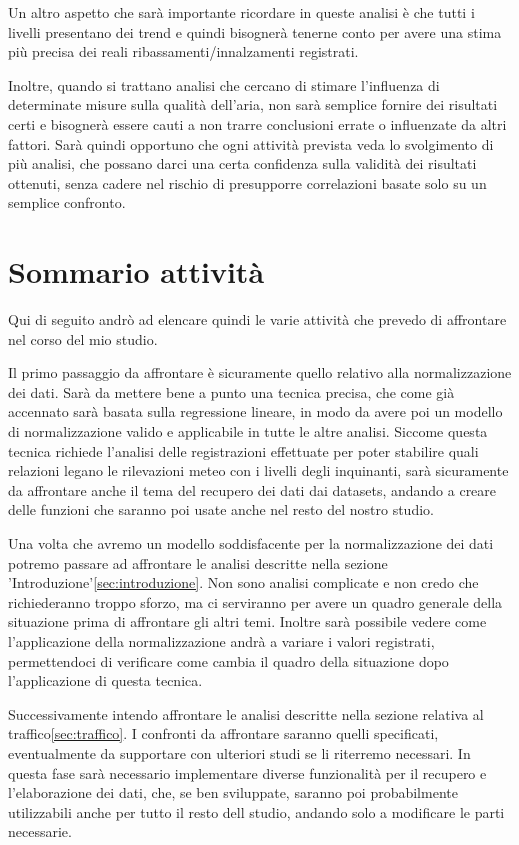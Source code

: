 \documentclass{article}
\begin{document}
Un altro aspetto che sarà importante ricordare in queste analisi è che tutti i livelli presentano dei trend e quindi bisognerà tenerne conto per avere una stima più precisa dei reali ribassamenti/innalzamenti registrati.

Inoltre, quando si trattano analisi che cercano di stimare l'influenza di determinate misure sulla qualità dell'aria, non sarà semplice fornire dei risultati certi e bisognerà essere cauti a non trarre conclusioni errate o influenzate da altri fattori. Sarà quindi opportuno che ogni attività prevista veda lo svolgimento di più analisi, che possano darci una certa confidenza sulla validità dei risultati ottenuti, senza cadere nel rischio di presupporre correlazioni basate solo su un semplice confronto.


\section{Sommario attività}
Qui di seguito andrò ad elencare quindi le varie attività che prevedo di affrontare nel corso del mio studio.

Il primo passaggio da affrontare è sicuramente quello relativo alla normalizzazione dei dati. Sarà da mettere bene a punto una tecnica precisa, che come già accennato sarà basata sulla regressione lineare, in modo da avere poi un modello di normalizzazione valido e applicabile in tutte le altre analisi. Siccome questa tecnica richiede l'analisi delle registrazioni effettuate per poter stabilire quali relazioni legano le rilevazioni meteo con i livelli degli inquinanti, sarà sicuramente da affrontare anche il tema del recupero dei dati dai datasets, andando a creare delle funzioni che saranno poi usate anche nel resto del nostro studio.%

Una volta che avremo un modello soddisfacente per la normalizzazione dei dati potremo passare ad affrontare le analisi descritte nella sezione 'Introduzione'\ref{sec:introduzione}. Non sono analisi complicate e non credo che richiederanno troppo sforzo, ma ci serviranno per avere un quadro generale della situazione prima di affrontare gli altri temi. Inoltre sarà possibile vedere come l'applicazione della normalizzazione andrà a variare i valori registrati, permettendoci di verificare come cambia il quadro della situazione dopo l'applicazione di questa tecnica.

Successivamente intendo affrontare le analisi descritte nella sezione relativa al traffico\ref{sec:traffico}. I confronti da affrontare saranno quelli specificati, eventualmente da supportare con ulteriori studi se li riterremo necessari. In questa fase sarà necessario implementare diverse funzionalità per il recupero e l'elaborazione dei dati, che, se ben sviluppate, saranno poi probabilmente utilizzabili anche per tutto il resto dell studio, andando solo a modificare le parti necessarie.
\end{document}

